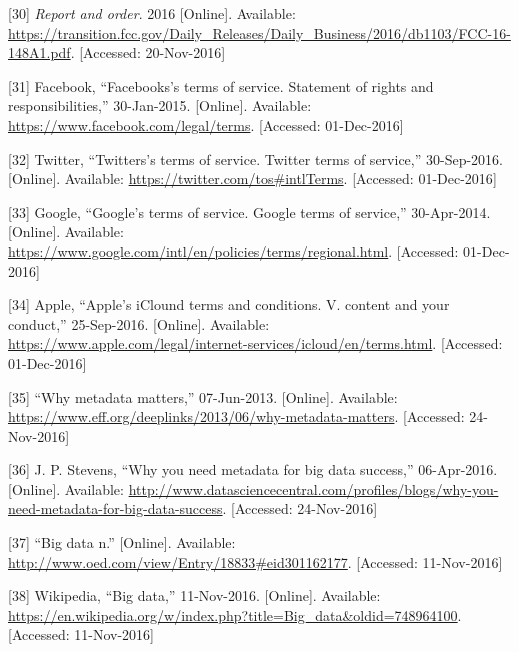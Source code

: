 \documentclass[12pt,english,a4paper,titlepage,cleardoublepage=empty,dottedtoc]{report}
\begin{document}
\hypertarget{ref-rules_2016_fcc_to-protect-broadband-consumer-privacy_ownership}{}
{[}30{]} \emph{Report and order}. 2016 {[}Online{]}. Available:
\url{https://transition.fcc.gov/Daily_Releases/Daily_Business/2016/db1103/FCC-16-148A1.pdf}.
{[}Accessed: 20-Nov-2016{]}

\hypertarget{ref-web_2016_facebook_terms-of-service}{}
{[}31{]} Facebook, ``Facebooks's terms of service. Statement of rights
and responsibilities,'' 30-Jan-2015. {[}Online{]}. Available:
\url{https://www.facebook.com/legal/terms}. {[}Accessed: 01-Dec-2016{]}

\hypertarget{ref-web_2016_twitter_terms-of-service}{}
{[}32{]} Twitter, ``Twitters's terms of service. Twitter terms of
service,'' 30-Sep-2016. {[}Online{]}. Available:
\url{https://twitter.com/tos\#intlTerms}. {[}Accessed: 01-Dec-2016{]}

\hypertarget{ref-web_2016_google_terms-of-service}{}
{[}33{]} Google, ``Google's terms of service. Google terms of service,''
30-Apr-2014. {[}Online{]}. Available:
\url{https://www.google.com/intl/en/policies/terms/regional.html}.
{[}Accessed: 01-Dec-2016{]}

\hypertarget{ref-web_2016_apple-icloud_terms-of-service}{}
{[}34{]} Apple, ``Apple's iClound terms and conditions. V. content and
your conduct,'' 25-Sep-2016. {[}Online{]}. Available:
\url{https://www.apple.com/legal/internet-services/icloud/en/terms.html}.
{[}Accessed: 01-Dec-2016{]}

\hypertarget{ref-web_2013_why-metadata-matters}{}
{[}35{]} ``Why metadata matters,'' 07-Jun-2013. {[}Online{]}. Available:
\url{https://www.eff.org/deeplinks/2013/06/why-metadata-matters}.
{[}Accessed: 24-Nov-2016{]}

\hypertarget{ref-web_2016_why-you-need-metadata-for-big-data-to-success}{}
{[}36{]} J. P. Stevens, ``Why you need metadata for big data success,''
06-Apr-2016. {[}Online{]}. Available:
\url{http://www.datasciencecentral.com/profiles/blogs/why-you-need-metadata-for-big-data-success}.
{[}Accessed: 24-Nov-2016{]}

\hypertarget{ref-web_2016_oxford_definition_big-data}{}
{[}37{]} ``Big data n.'' {[}Online{]}. Available:
\url{http://www.oed.com/view/Entry/18833\#eid301162177}. {[}Accessed:
11-Nov-2016{]}

\hypertarget{ref-web_2016_wikipedia_definition_big-data}{}
{[}38{]} Wikipedia, ``Big data,'' 11-Nov-2016. {[}Online{]}. Available:
\url{https://en.wikipedia.org/w/index.php?title=Big_data\&oldid=748964100}.
{[}Accessed: 11-Nov-2016{]}
\end{document}
